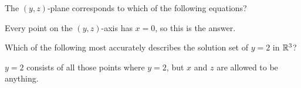 \documentclass{ximera}
\begin{document}
\begin{question}
  The $(y,z)$-plane corresponds to which of the following
  equations?
  \begin{multipleChoice}
  \end{multipleChoice}
  \begin{hint}
    Every point on the $(y,z)$-axis has $x=0$, so this is the answer.
  \end{hint}
\end{question}

\begin{question}
  Which of the following most accurately describes the solution
  set of $y=2$ in $\mathbb R^3$?
  \begin{multipleChoice}
  \end{multipleChoice}
  \begin{hint}
    $y=2$ consists of all those points where $y=2$, but $x$ and
    $z$ are allowed to be anything.  
  \end{hint}
\end{question}



\end{document}
